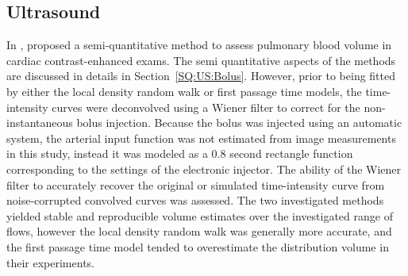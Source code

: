 \subsection{Ultrasound}
In \citeyear{Mischi:2004cn}, \citet{Mischi:2004cn} proposed a semi-quantitative method to assess pulmonary blood volume in cardiac contrast-enhanced exams.
The semi quantitative aspects of the methods are discussed in details in Section~\ref{SQ:US:Bolus}.
However, prior to being fitted by either the local density random walk or first passage time models, the time-intensity curves were deconvolved using a Wiener filter to correct for the non-instantaneous bolus injection.
Because the bolus was injected using an automatic system, the arterial input function was not estimated from image measurements in this study, instead it was modeled as a 0.8 second rectangle function corresponding to the settings of the electronic injector.
The ability of the Wiener filter to accurately recover the original or simulated time-intensity curve from noise-corrupted convolved curves was assessed.
The two investigated methods yielded stable and reproducible volume estimates over the investigated range of flows, however the local density random walk was generally more accurate, and the first passage time model tended to overestimate the distribution volume in their experiments.


